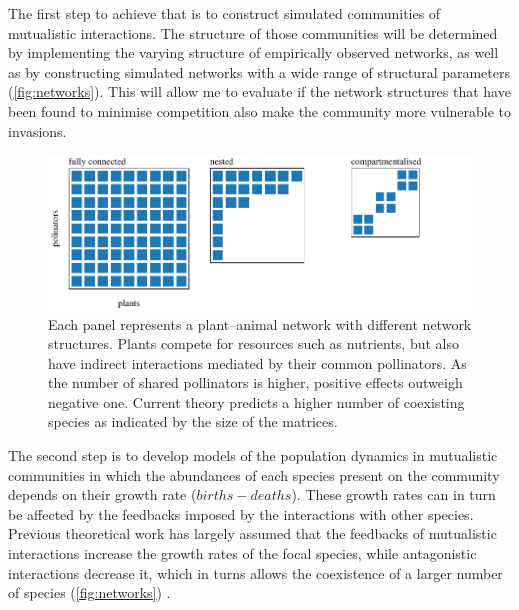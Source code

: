 \documentclass[a4paper]{article}
\begin{document}
The first step to achieve that is to construct simulated communities of mutualistic interactions.
The structure of those communities will be determined by implementing the varying structure of empirically observed networks, as well as by constructing simulated networks with a wide range of structural parameters (\autoref{fig:networks}).
This will allow me to evaluate if the network structures that have been found to minimise competition also make the community more vulnerable to invasions.

\begin{figure}[tbp]
  \includegraphics{networks}
  \caption{
  \label{fig:networks}
  Each panel represents a plant–animal network with different network structures.
  Plants compete for resources such as nutrients, but also have indirect interactions mediated by their common pollinators.
  As the number of shared pollinators is higher, positive effects outweigh negative one.
  Current theory predicts a higher number of coexisting species as indicated by the size of the matrices.
  }
\end{figure}

The second step is to develop models of the population dynamics in mutualistic communities in which the abundances of each species present on the community depends on their growth rate ($births - deaths$).
These growth rates can in turn be affected by the feedbacks imposed by the interactions with other species.
Previous theoretical work has largely assumed that the feedbacks of mutualistic interactions increase the growth rates of the focal species, while antagonistic interactions decrease it, which in turns allows the coexistence of a larger number of species (\autoref{fig:networks}) \cite{Moeller2004, Bastolla2009}.
\end{document}
